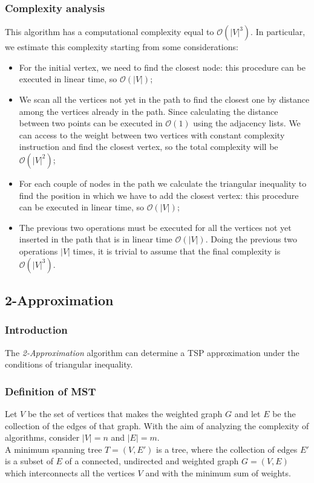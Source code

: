 \subsubsection{Complexity analysis}
This algorithm has a computational complexity equal to $\mathcal{O}(|V|^3)$. In particular, we estimate this complexity starting from some considerations:
\begin{itemize}
    \item For the initial vertex, we need to find the closest node: this procedure can be executed in linear time, so $\mathcal{O}(|V|)$;
    \item We scan all the vertices not yet in the path to find the closest one by distance among the vertices already in the path. Since calculating the distance between two points can be executed in $\mathcal{O}(1)$ using the adjacency lists. We can access to the weight between two vertices with constant complexity instruction and find the closest vertex, so the total complexity will be $\mathcal{O}(|V|^2)$;
    \item For each couple of nodes in the path we calculate the triangular inequality to find the position in which we have to add the closest vertex: this procedure can be executed in linear time, so $\mathcal{O}(|V|)$;
    \item The previous two operations must be executed for all the vertices not yet inserted in the path that is in linear time $\mathcal{O}(|V|)$. Doing the previous two operations $|V|$ times, it is trivial to assume that the final complexity is $\mathcal{O}(|V|^3)$. 
\end{itemize}

\subsection{2-Approximation}

\subsubsection{Introduction}
The \textit{2-Approximation} algorithm can determine a TSP approximation under the conditions of triangular inequality.

\subsubsection{Definition of MST}
Let $V$ be the set of vertices that makes the weighted graph $G$ and let $E$ be the collection of the edges of that graph. With the aim of analyzing the complexity of algorithms, consider $|V| = n$ and $|E| = m$. \\
A minimum spanning tree $T = (V,E')$ is a tree, where the collection of edges $E'$ is a subset of $E$ of a connected, undirected and weighted graph $G = (V,E)$ which interconnects all the vertices $V$ and with the minimum sum of weights. \\

